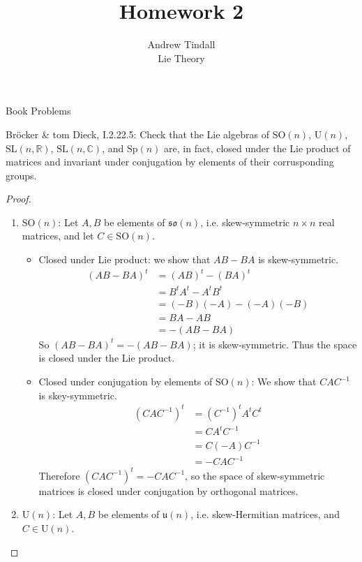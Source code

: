 \documentclass[12pt]{article}
\newcommand{\R}{\mathbb{R}}
\newcommand{\C}{\mathbb{C}}
\theoremstyle{definition}
\newenvironment{problem}[2][Problem]{\begin{trivlist}
\item[\hskip \labelsep {\bfseries #1}\hskip \labelsep {\bfseries #2.}]}{\end{trivlist}}
\begin{document}
 
 
\title{Homework 2}
\author{Andrew Tindall\\
Lie Theory}
 
\maketitle
\begin{section}{Book Problems}
	\begin{problem}{1}
		Br\"ocker \& tom Dieck, I.2.22.5: Check that the Lie algebras of $\text{SO}(n)$, $\text{U}(n)$, $\text{SL}(n,\R)$, $\text{SL}(n,\C)$, and $\text{Sp}(n)$ are, in fact, closed under the Lie product of matrices and invariant under conjugation by elements of their corrusponding groups. 
		\begin{proof}
			\begin{enumerate}[label=(\alph*)]
				\item $\text{SO}(n)$: Let $A, B$ be elements of $\mathfrak{so}(n)$, i.e. skew-symmetric $n\times n$ real matrices, and let $C \in \text{SO}(n)$. 
					\begin{itemize}
						\item Closed under Lie product: we show that $AB - BA$ is skew-symmetric. 
							\begin{align*}
								(AB - BA)^t &= (AB)^t - (BA)^t\\
								&= B^tA^t - A^tB^t\\
								&= (-B)(-A) - (-A)(-B)\\
								&= BA - AB\\
								&= -(AB - BA)
							\end{align*}
							So $(AB - BA)^t = -(AB - BA)$; it is skew-symmetric. Thus the space is closed under the Lie product.
						\item Closed under conjugation by elements of $\text{SO}(n)$: We show that $CAC^{-1}$ is skey-symmetric.
							\begin{align*}
								(CAC^{-1})^t &= (C^{-1})^tA^tC^t\\
								&= CA^tC^{-1}\\
								&= C(-A)C^{-1}\\
								&= -CAC^{-1}
							\end{align*}
							Therefore $(CAC^{-1})^t = -CAC^{-1}$, so the space of skew-symmetric matrices is closed under conjugation by orthogonal matrices.
					\end{itemize}
				\item $\text{U}(n)$: Let $A, B$ be elements of $\mathfrak{u}(n)$, i.e. skew-Hermitian matrices, and $C \in \text{U}(n)$.

\end{enumerate}
\end{proof}
\end{problem}
\end{section}
\end{document}
